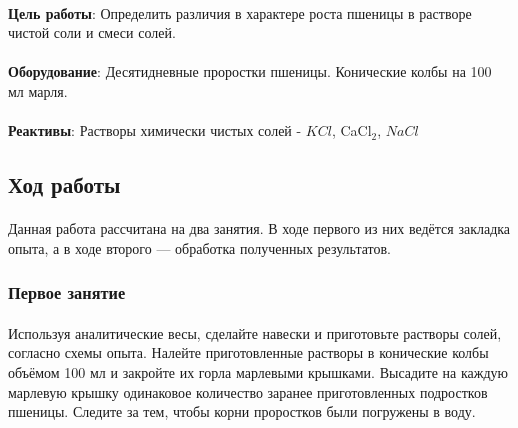 
\paragraph*{}\textbf{Цель работы}: Определить различия в характере роста пшеницы в растворе чистой соли и смеси солей.

\paragraph*{}\textbf{Оборудование}: Десятидневные проростки пшеницы. Конические колбы на 100 мл марля.

\paragraph*{}\textbf{Реактивы}: Растворы химически чистых солей - $KCl$, CaCl${_2}$, $NaCl$

	\subsection*{Ход работы}
	
\paragraph*{}Данная работа рассчитана на два занятия. В ходе первого из них ведётся закладка опыта, а в ходе второго — обработка полученных результатов.
	
	\subsubsection*{Первое занятие}
	
	\paragraph*{}Используя аналитические весы, сделайте навески и приготовьте растворы солей, согласно схемы опыта. Налейте приготовленные растворы в конические колбы объёмом 100 мл и закройте их горла марлевыми крышками. Высадите на каждую марлевую крышку одинаковое количество заранее приготовленных подростков пшеницы. Следите за тем, чтобы корни проростков были погружены в воду.
	
